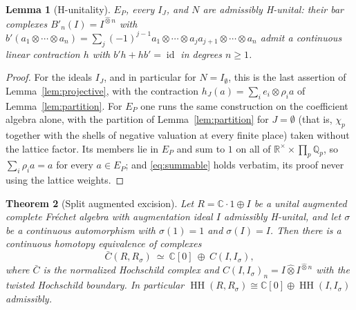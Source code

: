 \documentclass[11pt]{amsart}
\newtheorem{theorem}{Theorem}[section]
\newtheorem{lemma}[theorem]{Lemma}
\theoremstyle{definition}
\theoremstyle{remark}
\newcommand{\C}{\mathbb C}
\newcommand{\R}{\mathbb R}
\newcommand{\Q}{\mathbb Q}
\newcommand{\id}{\operatorname{id}}
\newcommand{\HH}{\operatorname{HH}}
\begin{document}
\begin{lemma}[H-unitality]\label{lem:hunital}
$E_P$, every $I_J$, and $N$ are admissibly H-unital: their bar complexes
$B'_n(I)=I^{\widehat\otimes n}$ with
$b'(a_1\otimes\cdots\otimes a_n)=\sum_j(-1)^{j-1}a_1\otimes\cdots\otimes
a_ja_{j+1}\otimes\cdots\otimes a_n$ admit a continuous linear contraction $h$
with $b'h+hb'=\id$ in degrees $n\ge1$.
\end{lemma}

\begin{proof}
For the ideals $I_J$, and in particular for $N=I_{\emptyset}$, this is the
last assertion of Lemma~\ref{lem:projective}, with the contraction
$h_J(a)=\sum_ie_i\otimes\rho_ia$ of Lemma~\ref{lem:partition}.  For $E_P$ one
runs the same construction on the coefficient algebra alone, with the
partition of Lemma~\ref{lem:partition} for $J=\emptyset$ (that is, $\chi_p$
together with the shells of negative valuation at every finite place) taken
without the lattice factor.  Its members lie in $E_P$ and sum to $1$ on all of
$\R^{\times}\times\prod_p\Q_p$, so $\sum_i\rho_ia=a$ for every $a\in E_P$;
and \eqref{eq:summable} holds verbatim, its proof never using the lattice
weights.
\end{proof}

\begin{theorem}[Split augmented excision]\label{thm:B2}
Let $R=\C\cdot1\oplus I$ be a unital augmented complete Fr\'echet algebra with
augmentation ideal $I$ admissibly H-unital, and let $\sigma$ be a continuous
automorphism with $\sigma(1)=1$ and $\sigma(I)=I$.  Then there is a continuous
homotopy equivalence of complexes
\[
\bar C(R,R_{\sigma})\ \simeq\ \C[0]\ \oplus\ C(I,I_{\sigma}),
\]
where $\bar C$ is the normalized Hochschild complex and
$C(I,I_{\sigma})_n=I\widehat\otimes I^{\widehat\otimes n}$ with the twisted
Hochschild boundary.  In particular
$\HH(R,R_{\sigma})\cong\C[0]\oplus\HH(I,I_{\sigma})$ admissibly.
\end{theorem}
\end{document}
